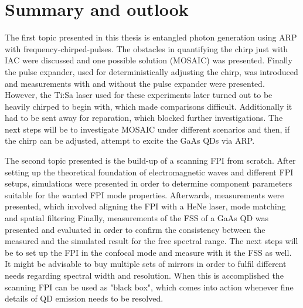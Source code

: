 \chapter{Summary and outlook}
The first topic presented in this thesis is entangled photon generation using \ac{ARP} with frequency-chirped-pulses.
The obstacles in quantifying the chirp just with \ac{IAC} were discussed and one possible solution (\ac{MOSAIC}) was presented.
Finally the pulse expander, used for deterministically adjusting the chirp, was introduced and measurements with and without the pulse expander were presented.
However, the Ti:Sa laser used for these experiments later turned out to be heavily chirped to begin with, which made comparisons difficult.
Additionally it had to be sent away for reparation, which blocked further investigations.
The next steps will be to investigate \ac{MOSAIC} under different scenarios and then, if the chirp can be adjusted, attempt to excite the GaAs \acp{QD} via \ac{ARP}.

The second topic presented is the build-up of a scanning \ac{FPI} from scratch.
After setting up the theoretical foundation of electromagnetic waves and different \ac{FPI} setups, simulations were presented in order to determine component parameters suitable for the wanted \ac{FPI} mode properties.
Afterwards, measurements were presented, which involved aligning the \ac{FPI} with a HeNe laser, mode matching and spatial filtering
Finally, measurements of the \ac{FSS} of a GaAs \ac{QD} was presented and evaluated in order to confirm the consistency between the measured and the simulated result for the free spectral range.
The next steps will be to set up the \ac{FPI} in the confocal mode and measure with it the \ac{FSS} as well.
It might be advisable to buy multiple sets of mirrors in order to fulfil different needs regarding spectral width and resolution.
When this is accomplished the scanning \ac{FPI} can be used as "black box", which comes into action whenever fine details of \ac{QD} emission needs to be resolved.